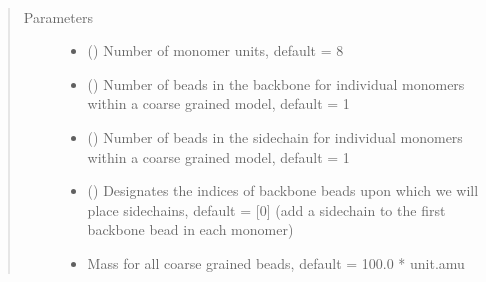 \documentclass[letterpaper,12pt,english,openany,oneside]{sphinxmanual}
\begin{document}
\begin{fulllineitems}
\label{\detokenize{cg_model:cg_model.cgmodel.basic_cgmodel}}~\begin{quote}\begin{description}
\item[{Parameters}] \leavevmode\begin{itemize}
\item {} 
 () \textendash{} Number of monomer units, default = 8

\item {} 
 () \textendash{} Number of beads in the backbone for individual monomers within a coarse grained model, default = 1

\item {} 
 () \textendash{} Number of beads in the sidechain for individual monomers within a coarse grained model, default = 1

\item {} 
 (\sphinxstyleliteralemphasis{\sphinxupquote{( }}\sphinxstyleliteralemphasis{\sphinxupquote{ )}}) \textendash{} Designates the indices of backbone beads upon which we will place sidechains, default = {[}0{]} (add a sidechain to the first backbone bead in each monomer)

\item {} 
 \textendash{} Mass for all coarse grained beads, default = 100.0 * unit.amu


\end{itemize}
\end{description}
\end{quote}
\end{fulllineitems}
\end{document}
